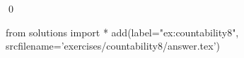 
\begin{ex} 
  \label{ex:countability8}
  
  \qed
\end{ex} 
\begin{python0}
from solutions import *
add(label="ex:countability8",
    srcfilename='exercises/countability8/answer.tex') 
\end{python0}
